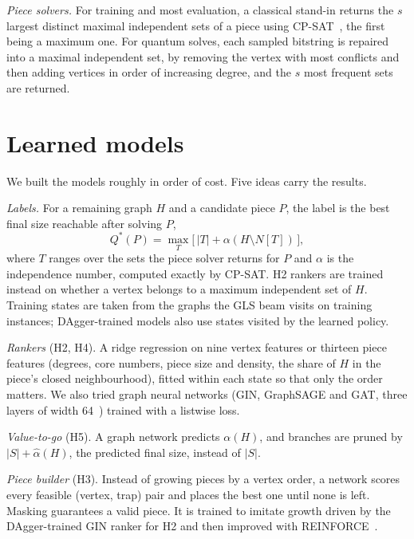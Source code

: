 \documentclass[10pt,pra,aps,twocolumn,superscriptaddress,floatfix,nofootinbib]{revtex4-2}
\newcommand{\GLS}{GLS}
\begin{document}
\textit{Piece solvers.} For training and most evaluation, a classical stand-in returns the $s$ largest distinct maximal independent sets of a piece using CP-SAT~\cite{ortools}, the first being a maximum one. For quantum solves, each sampled bitstring is repaired into a maximal independent set, by removing the vertex with most conflicts and then adding vertices in order of increasing degree, and the $s$ most frequent sets are returned.

\section{Learned models}
\label{sec:models}

We built the models roughly in order of cost. Five ideas carry the results.

\textit{Labels.} For a remaining graph $H$ and a candidate piece $P$, the label is the best final size reachable after solving $P$,
\begin{equation}
Q^*(P) = \max_{T} \bigl[\, |T| + \alpha(H \setminus N[T]) \,\bigr],
\label{eq:q}
\end{equation}
where $T$ ranges over the sets the piece solver returns for $P$ and $\alpha$ is the independence number, computed exactly by CP-SAT. H2 rankers are trained instead on whether a vertex belongs to a maximum independent set of $H$. Training states are taken from the graphs the \GLS{} beam visits on training instances; DAgger-trained models also use states visited by the learned policy.

\textit{Rankers} (H2, H4). A ridge regression on nine vertex features or thirteen piece features (degrees, core numbers, piece size and density, the share of $H$ in the piece's closed neighbourhood), fitted within each state so that only the order matters. We also tried graph neural networks (GIN, GraphSAGE and GAT, three layers of width 64~\cite{xu2019gin,hamilton2017sage,velickovic2018gat}) trained with a listwise loss.

\textit{Value-to-go} (H5). A graph network predicts $\alpha(H)$, and branches are pruned by $|S| + \hat\alpha(H)$, the predicted final size, instead of $|S|$.

\textit{Piece builder} (H3). Instead of growing pieces by a vertex order, a network scores every feasible (vertex, trap) pair and places the best one until none is left. Masking guarantees a valid piece. It is trained to imitate growth driven by the DAgger-trained GIN ranker for H2 and then improved with REINFORCE~\cite{williams1992reinforce}.
\end{document}
